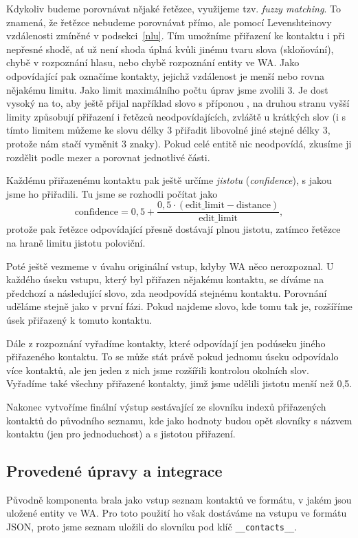 Kdykoliv budeme porovnávat nějaké řetězce, využijeme tzv. \textit{fuzzy matching}.
To znamená, že řetězce nebudeme porovnávat přímo, ale pomocí Levenshteinovy vzdálenosti
zmíněné v podsekci~\ref{nlu}. Tím umožníme přiřazení ke kontaktu i při nepřesné shodě,
ať už není shoda úplná kvůli jinému tvaru slova (skloňování), chybě v rozpoznání
hlasu, nebo chybě rozpoznání entity ve WA. Jako odpovídající pak označíme kontakty,
jejichž vzdálenost je menší nebo rovna nějakému limitu. Jako limit maximálního počtu
úprav jsme zvolili 3. Je dost vysoký na to, aby ještě přijal například slovo s příponou
, na druhou stranu vyšší limity způsobují přiřazení i řetězců neodpovídajících,
zvláště u krátkých slov (i s tímto limitem můžeme ke slovu délky 3 přiřadit libovolné jiné
stejné délky 3, protože nám stačí vyměnit 3 znaky). Pokud celé entitě nic neodpovídá,
zkusíme ji rozdělit podle mezer a porovnat jednotlivé části.

Každému přiřazenému kontaktu pak ještě určíme \textit{jistotu} (\textit{confidence}),
s jakou jsme ho přiřadili. Tu jsme se rozhodli počítat jako
\[ \text{confidence} = 0,5 + \frac{0,5 \cdot (\text{edit\_limit} - \text{distance})}{\text{edit\_limit}} ,\]
protože pak řetězce odpovídající přesně dostávají plnou jistotu, zatímco řetězce na
hraně limitu jistotu poloviční.

Poté ještě vezmeme v úvahu originální vstup, kdyby WA něco nerozpoznal. U každého
úseku vstupu, který byl přiřazen nějakému kontaktu, se díváme na předchozí a následující
slovo, zda neodpovídá stejnému kontaktu. Porovnání uděláme stejně jako v první fázi.
Pokud najdeme slovo, kde tomu tak je, rozšíříme úsek přiřazený k tomuto kontaktu.

Dále z rozpoznání vyřadíme kontakty, které odpovídají jen podúseku jiného
přiřazeného kontaktu. To se může stát právě pokud jednomu úseku odpovídalo více
kontaktů, ale jen jeden z nich jsme rozšířili kontrolou okolních slov. Vyřadíme také
všechny přiřazené kontakty, jimž jsme udělili jistotu menší než 0,5.

Nakonec vytvoříme finální výstup sestávající ze slovníku indexů přiřazených kontaktů
do původního seznamu, kde jako hodnoty budou opět slovníky s názvem kontaktu (jen pro
jednoduchost) a s jistotou přiřazení.

\subsection{Provedené úpravy a integrace}

Původně komponenta brala jako vstup seznam kontaktů ve formátu, v jakém jsou uložené
entity ve WA. Pro toto použití ho však dostáváme na vstupu ve formátu JSON, proto
jsme seznam uložili do slovníku pod klíč \texttt{\_\_contacts\_\_}.

